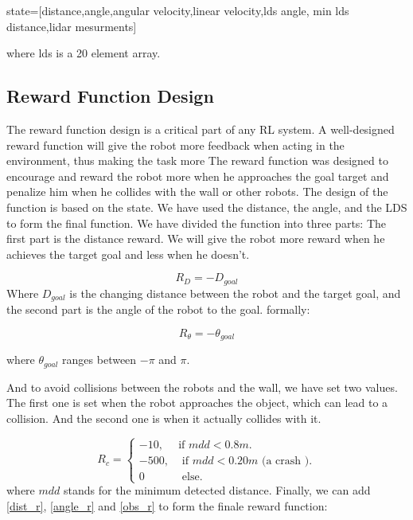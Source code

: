 \documentclass[12pt]{extarticle}
\begin{document}
state=[distance,angle,angular velocity,linear velocity,lds angle,
min lds distance,lidar mesurments]

where lds is a 20 element array.

\subsection{Reward Function Design}

The reward function design is a critical part of any RL system. A well-designed reward function will give the robot more feedback when acting in the environment, thus making the task more 
The reward function was designed to encourage and reward the robot more when he approaches the goal target and penalize him when he collides with the wall or other robots.
The design of the function is based on the state. We have used the distance, the angle, and the LDS to form the final function.
We have divided the function into three parts: The first part is the distance reward. We will give the robot more reward when he achieves the target goal and less when he doesn't.
   
\setcounter{equation}{0}

       \begin{equation} \label{dist_r}
     R_{D}=-D_{goal}
   \end{equation}
 Where $D_{goal}$ is the changing distance between the robot and the target goal, and the second part is the angle of the robot to the goal. formally:


     \begin{equation} \label{angle_r}
     R_{\theta}=-\theta_{goal}
   \end{equation}
 
 where $\theta_{goal}$  ranges  between $-\pi$  and $\pi$.
 
And to avoid collisions between the robots and the wall, we have set two values. The first one is set when the robot approaches the object, which can lead to a collision. And the second one is when it actually collides with it.


\begin{equation}  \label{obs_r}
  R_{c}=\begin{cases}
    -10, & \text{if $mdd< 0.8m$}.\\
    -500 , & \text{ if $mdd <0.20m$ (a crash )}.\\
    0 & \text{ else}.
  \end{cases}
\end{equation}
where $mdd$ stands for the minimum detected distance.\linebreak
Finally, we can add \ref{dist_r}, \ref{angle_r} and \ref{obs_r} to form the finale reward function: 
\end{document}
